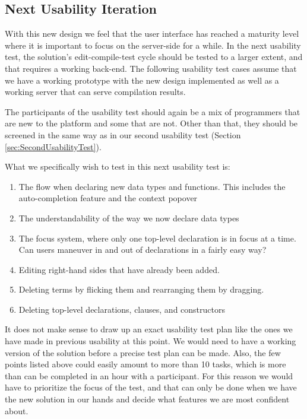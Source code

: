 \subsection{Next Usability Iteration}
With this new design we feel that the user interface has reached a maturity
level where it is important to focus on the server-side for a while. In the
next usability test, the solution's edit-compile-test cycle should be tested to
a larger extent, and that requires a working back-end. The following usability
test cases assume that we have a working prototype with the new design
implemented as well as a working server that can serve compilation results.

The participants of the usability test should again be a mix of programmers
that are new to the platform and some that are not. Other than that, they
should be screened in the same way as in our second usability test (Section
\ref{sec:SecondUsabilityTest}).

What we specifically wish to test in this next usability test is:

\begin{enumerate}
	\item The flow when declaring new data types and functions. This includes the auto-completion feature and the context popover
	\item The understandability of the way we now declare data types
	\item The focus system, where only one top-level declaration is in focus at a
	time. Can users maneuver in and out of declarations in a fairly easy way?
	\item Editing right-hand sides that have already been added.
	\item Deleting terms by flicking them and rearranging them by dragging.
	\item Deleting top-level declarations, clauses, and constructors
\end{enumerate}

It does not make sense to draw up an exact usability test plan like the ones we have made in previous usability
at this point. We would need to have a working version of the solution before a precise test plan can be made. Also, the few points listed above could easily amount to more than 10 tasks, which is more than can be completed in an hour with a participant. For this reason we would have to prioritize the focus of the test, and that can only be done when we have the new solution in our hands and decide what features we are most confident about. 

















